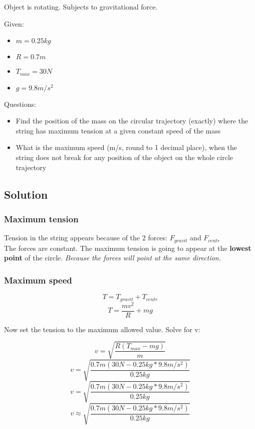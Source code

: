 
Object is rotating. Subjects to gravitational force.


\bigbreak Given: 
\begin{itemize}
    \item $  m  = 0.25kg $
    \item $ R = 0.7m $
    \item $ T_{max} = 30N $
    \item $ g = 9.8m/s^2 $
\end{itemize}


\bigbreak Questions:
\begin{itemize}
    \item Find the position of the mass on the circular trajectory (exactly) where the string has
    maximum tension at a given constant speed of the mass
    \item What is the maximum speed (m/s, round to 1 decimal place), when the string does not
    break for any position of the object on the whole circle trajectory
\end{itemize}

\subsection*{Solution}
\subsubsection*{Maximum tension}
Tension in the string appears because of the 2 forces: $F_{gravit}$ and $F_{centr}$ \\
The forces are constant. The maximum tension is going to appear at the \textbf{lowest point} of the circle.
\textit{Because the forces will point at the same direction.}


\subsubsection*{Maximum speed}
$$ T = T_{gravit} + T_{centr} $$
$$ T = \frac{mv^2}{R} + mg $$

Now set the tension to the maximum allowed value. Solve for v:

$$  v =  \sqrt{\frac{R(T_{max} - mg)}{m}} $$
$$  v =  \sqrt{\frac{0.7m(30N - 0.25kg * 9.8m/s^2)}{0.25kg}} $$
$$  v =  \sqrt{\frac{0.7m(30N - 0.25kg * 9.8m/s^2)}{0.25kg}} $$
$$  v \approx  \sqrt{\frac{0.7m(30N - 0.25kg * 9.8m/s^2)}{0.25kg}} $$


